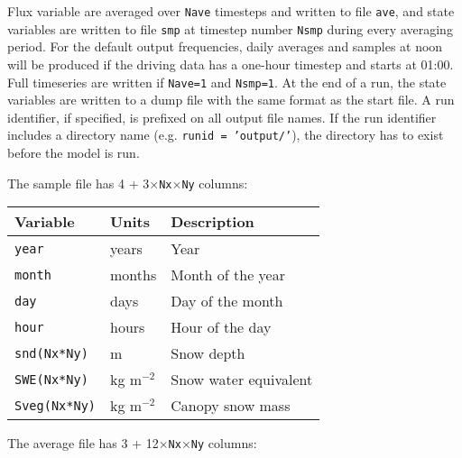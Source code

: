 \documentclass{article}
\begin{document}
Flux variable are averaged over {\tt Nave} timesteps and written to file {\tt ave}, and state variables are written to file {\tt smp} at timestep number {\tt Nsmp} during every averaging period. For the default output frequencies, daily averages and samples at noon will be produced if the driving data has a one-hour timestep and starts at 01:00. Full timeseries are written if {\tt Nave=1} and {\tt Nsmp=1}. At the end of a run, the state variables are written to a dump file with the same format as the start file. A run identifier, if specified, is prefixed on all output file names. If the run identifier includes a directory name (e.g. {\tt runid = 'output/'}), the directory has to exist before the model is run.

The sample file has 4 + 3$\times${\tt Nx$\times$Ny} columns:

\begin{tabular}{|l|l|l|}
\hline
Variable          & Units       & Description           \\
\hline
{\tt year}        & years       & Year                  \\
{\tt month}       & months      & Month of the year     \\
{\tt day}         & days        & Day of the month      \\
{\tt hour}        & hours       & Hour of the day       \\
{\tt snd(Nx*Ny)}  & m           & Snow depth            \\
{\tt SWE(Nx*Ny)}  & kg m$^{-2}$ & Snow water equivalent \\
{\tt Sveg(Nx*Ny)} & kg m$^{-2}$ & Canopy snow mass      \\
\hline 
\end{tabular}

The average file has 3 + 12$\times${\tt Nx$\times$Ny} columns:
\end{document}

